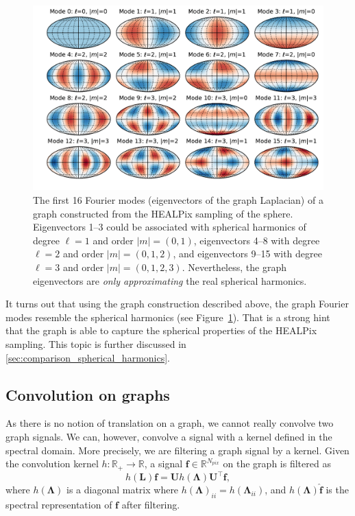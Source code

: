 \documentclass[final,twocolumn,3p,times,authoryear]{elsarticle}
\newcommand{\figref}[1]{Figure~\ref{fig:#1}}
\renewcommand{\b}[1]{{\bm{#1}}}   %
\newcommand{\1}{\b{1}}              %
\newcommand{\0}{\b{0}}              %
\renewcommand{\L}{\b{L}}
\newcommand{\U}{\b{U}}
\newcommand{\f}{\b{f}}
\newcommand{\trans}{^\intercal}
\newcommand{\R}{\mathbb{R}}
\newcommand{\bLambda}{\b{\Lambda}}
\begin{document}
\begin{figure}
	\centering
	\includegraphics[width=\linewidth]{eigenvectors}
	\caption{The first 16 Fourier modes (eigenvectors of the graph Laplacian) of a graph constructed from the HEALPix sampling of the sphere. Eigenvectors 1--3 could be associated with spherical harmonics of degree $\ell=1$ and order $|m|=(0,1)$, eigenvectors 4--8 with degree $\ell=2$ and order $|m|=(0,1,2)$, and eigenvectors 9--15 with degree $\ell=3$ and order $|m|=(0,1,2,3)$. Nevertheless, the graph eigenvectors are \emph{only approximating} the real spherical harmonics.}
	\label{fig:graph_harmonics}
\end{figure}

It turns out that using the graph construction described above, the graph Fourier modes resemble the spherical harmonics (see \figref{graph_harmonics}). That is a strong hint that the graph is able to capture the spherical properties of the HEALPix sampling. This topic is further discussed in \ref{sec:comparison_spherical_harmonics}.

\subsection{Convolution on graphs}
\label{sec:graph_convolution}

As there is no notion of translation on a graph, we cannot really convolve two graph signals. We can, however, convolve a signal with a kernel defined in the spectral domain. More precisely, we are filtering a graph signal by a kernel. Given the convolution kernel
$h: \R_+ \rightarrow \R$, a signal $\f \in \R^{N_{pix}}$ on the graph is filtered as
\begin{equation} \label{eqn:graph_convolution}
	h(\L) \f = \U h(\bLambda) \U\trans \f,
\end{equation}
where $h(\bLambda)$ is a diagonal matrix where $h(\bLambda)_{ii} = h(\bLambda_{ii})$, and $h(\bLambda) \hat{\f}$ is the spectral representation of $\f$ after filtering.
\end{document}
